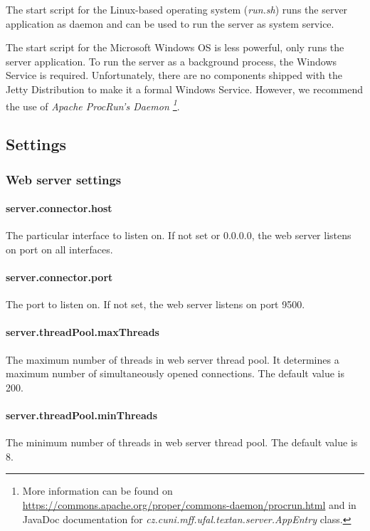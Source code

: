 \documentclass[12pt,a4paper]{report}
\begin{document}
The start script for the Linux-based operating system (\emph{run.sh}) runs the server application as daemon
and can be used to run the server as system service.

The start script for the Microsoft Windows OS is less powerful, only runs the server application. 
To run the server as a background process, the Windows Service is required. 
Unfortunately, there are no components shipped with the Jetty Distribution to make it a formal Windows Service.
However, we recommend the use of \emph{Apache ProcRun's Daemon
\footnote{More information can be found on \url{https://commons.apache.org/proper/commons-daemon/procrun.html} and in JavaDoc documentation for \emph{cz.cuni.mff.ufal.textan.server.AppEntry} class.}}.

\subsection{Settings}
\label{sec:ServerSettings}

\subsubsection{Web server settings}

\paragraph{server.connector.host} The particular interface to listen on. If not set or 0.0.0.0, the web server listens on port on all interfaces.

\paragraph{server.connector.port} The port to listen on. If not set, the web server listens on port 9500.

\paragraph{server.threadPool.maxThreads} The maximum number of threads in web server thread pool. It determines a maximum number of simultaneously opened connections. The default value is 200.

\paragraph{server.threadPool.minThreads} The minimum number of threads in web server thread pool. The default value is 8.
\end{document}
